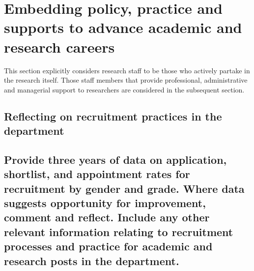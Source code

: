 \newpage 
\section{Embedding policy, practice and supports to advance academic and research careers}
\label{sec:academic}

This section explicitly considers research staff to be those who actively partake in the research itself. Those staff members that provide professional, administrative and managerial support to researchers are considered in the subsequent section.

\subsection{Reflecting on recruitment practices in the department}





\subsection{Provide three years of data on application, shortlist, and appointment rates for recruitment by gender and grade. Where data suggests opportunity for improvement, comment and reflect. Include any other relevant information relating to recruitment processes and practice for academic and research posts in the department. }


